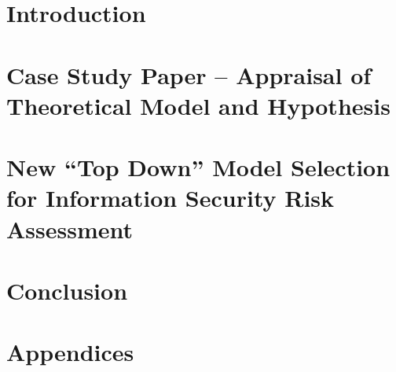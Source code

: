 \documentclass[harvard]{lincolncsthesis}
\begin{document}
\maketitle



\thesisTables
\thesisBodyStart

\chapter{Introduction}


\chapter{Case Study Paper – Appraisal of Theoretical Model and Hypothesis}


\chapter{New ``Top Down'' Model Selection for Information Security Risk Assessment}


\chapter{Conclusion}


\printReferences

\appendix
\chapter*{Appendices}

\end{document}
